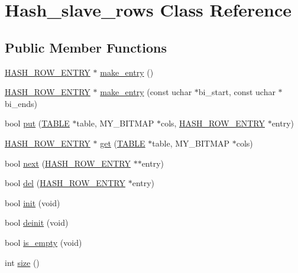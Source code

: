 \hypertarget{classHash__slave__rows}{}\section{Hash\+\_\+slave\+\_\+rows Class Reference}
\label{classHash__slave__rows}
\subsection*{Public Member Functions}
\begin{DoxyCompactItemize}
\item 
\mbox{\hyperlink{structhash__row__entry__st}{H\+A\+S\+H\+\_\+\+R\+O\+W\+\_\+\+E\+N\+T\+RY}} $\ast$ \mbox{\hyperlink{classHash__slave__rows_a5f6d6cf9561e924b1bb3585385a91d3a}{make\+\_\+entry}} ()
\item 
\mbox{\hyperlink{structhash__row__entry__st}{H\+A\+S\+H\+\_\+\+R\+O\+W\+\_\+\+E\+N\+T\+RY}} $\ast$ \mbox{\hyperlink{classHash__slave__rows_ae184c4d7ba20c3529c18362503d3cc81}{make\+\_\+entry}} (const uchar $\ast$bi\+\_\+start, const uchar $\ast$bi\+\_\+ends)
\item 
bool \mbox{\hyperlink{classHash__slave__rows_ad8b61674efb258c0a9cc22cc7add8090}{put}} (\mbox{\hyperlink{structTABLE}{T\+A\+B\+LE}} $\ast$table, M\+Y\+\_\+\+B\+I\+T\+M\+AP $\ast$cols, \mbox{\hyperlink{structhash__row__entry__st}{H\+A\+S\+H\+\_\+\+R\+O\+W\+\_\+\+E\+N\+T\+RY}} $\ast$entry)
\item 
\mbox{\hyperlink{structhash__row__entry__st}{H\+A\+S\+H\+\_\+\+R\+O\+W\+\_\+\+E\+N\+T\+RY}} $\ast$ \mbox{\hyperlink{classHash__slave__rows_a3f341c89bba321288653e82ea6bfe509}{get}} (\mbox{\hyperlink{structTABLE}{T\+A\+B\+LE}} $\ast$table, M\+Y\+\_\+\+B\+I\+T\+M\+AP $\ast$cols)
\item 
bool \mbox{\hyperlink{classHash__slave__rows_a7194d9f4f783f2a0e95d7486f0a71a30}{next}} (\mbox{\hyperlink{structhash__row__entry__st}{H\+A\+S\+H\+\_\+\+R\+O\+W\+\_\+\+E\+N\+T\+RY}} $\ast$$\ast$entry)
\item 
bool \mbox{\hyperlink{classHash__slave__rows_a2b17b1ca10fc73c3d3865b8abca67219}{del}} (\mbox{\hyperlink{structhash__row__entry__st}{H\+A\+S\+H\+\_\+\+R\+O\+W\+\_\+\+E\+N\+T\+RY}} $\ast$entry)
\item 
bool \mbox{\hyperlink{classHash__slave__rows_aa18a23b2801ebbcad9c0acac264a9205}{init}} (void)
\item 
bool \mbox{\hyperlink{classHash__slave__rows_a7281d442d80a5cb30e62d79c08d023d9}{deinit}} (void)
\item 
bool \mbox{\hyperlink{classHash__slave__rows_adf1fd971e92cb1fa456daafdf46b172e}{is\+\_\+empty}} (void)
\item 
int \mbox{\hyperlink{classHash__slave__rows_a90b2911134d7d9aa60637383bd88cb39}{size}} ()
\end{DoxyCompactItemize}


